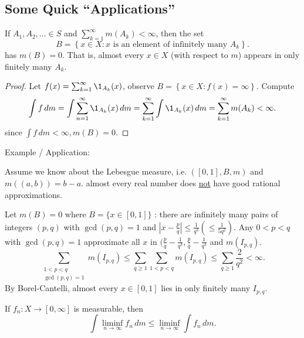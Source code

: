 \subsection{Some Quick ``Applications''}

\begin{theorem}
	If $A_1, A_2, \ldots \in S$ and $\sum_{k = 1}^{\infty} m(A_k) < \infty$, then the set
	\[
		B = \left\{x \in X : x \textrm{ is an element of infinitely many } A_k \right\}.
	\]
	has $m(B) = 0$.
	That is, almost every $x \in X$ (with respect to $m$) appears in only finitely many $A_k$.
\end{theorem}

\begin{proof}
	Let $f(x) = \sum_{k = 1}^{\infty} \1_{A_k}(x)$, observe $B = \left\{x \in X : f(x) = \infty \right\}$.
	Compute
	\[
		\int f \, dm = \int \sum_{n = 1}^{\infty} \1_{A_k}(x) \, dm = \sum_{k = 1}^{\infty} \int \1_{A_k}(x) \, dm = \sum_{k = 1}^{\infty} m(A_k) < \infty.
	\]
	since $\int f \, dm < \infty, m(B) = 0$.
\end{proof}

Example / Application:
\begin{example}[\& Application]
Assume we know about the Lebesgue measure, i.e. $([0,1], B, m)$ and $m((a,b)) = b - a$.
almost every real number does \underline{not} have good rational approximations.
\end{example}

\begin{theorem}
	Let $m(B) = 0$ where $B = \{ x \in [0,1] \}$ : there are infinitely many pairs of integers $(p,q)$ with $\gcd (p, q) = 1$ and $\left| x - \frac{p}{q} \right| \leq \frac{1}{q^3} \left( \leq \frac{1}{5q^2} \right)$.
	Any $0 < p < q$ with $\gcd(p,q) = 1$ approximate all $x$ in $(\frac{p}{q} - \frac{1}{q^3}, \frac{p}{q} - \frac{1}{q^3}$ and $m(I_{p,q})$.
	\[
		\sum_{\substack{1 < p < q \\ \gcd (p, q) = 1}} m(I_{p,q}) \leq \sum_{q \geq 1} \sum_{1 < p < q} m(I_{p, q}) \leq \sum_{q \geq 1}^{} \frac{2}{q^2} < \infty.
	\]
	By Borel-Cantelli, almost every $x \in [0,1]$ lies in only finitely many $I_{p,q}$.
\end{theorem}

\begin{lemma}
	If $f_n : X \to [0, \infty]$ is measurable, then
	\[
		\int \liminf_{n \to \infty} f_n \, dm \leq \liminf_{n \to \infty} \int f_n \, dm.
	\]
\end{lemma}

